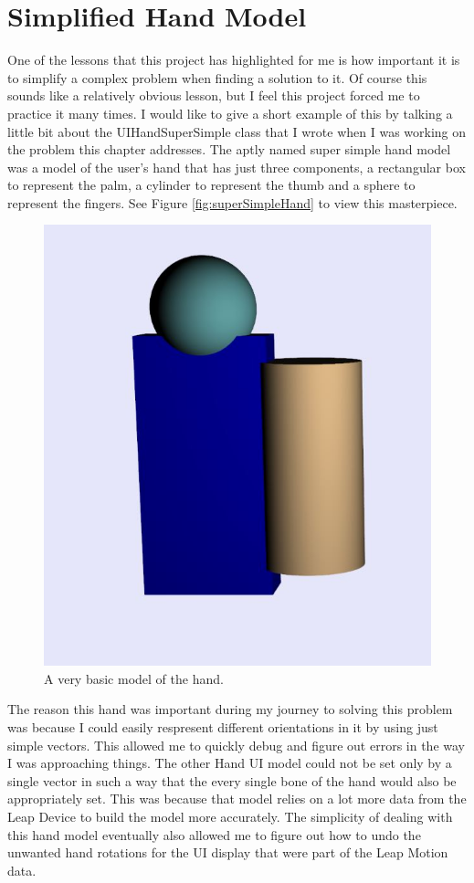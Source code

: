 \section{Simplified Hand Model}
One of the lessons that this project has highlighted for me is how important it is to simplify a complex problem when finding a solution to it. Of course this sounds like a relatively obvious lesson, but I feel this project forced me to practice it many times. I would like to give a short example of this by talking a little bit about the UIHandSuperSimple class that I wrote when I was working on the problem this chapter addresses. The aptly named super simple hand model was a model of the user's hand that has just three components, a rectangular box to represent the palm, a cylinder to represent the thumb and a sphere to represent the fingers. See Figure \ref{fig:superSimpleHand} to view this masterpiece. 
\begin{figure}[H]
\centering
\includegraphics[scale=0.35]{Figures/4_superSimpleHand.JPG}
\caption[UIHandSuperSimple Hand]{A very basic model of the hand.}
\label{fig:uncorrectedRoll}
\end{figure}
The reason this hand was important during my journey to solving this problem was because I could easily respresent different orientations in it by using just simple vectors. This allowed me to quickly debug and figure out errors in the way I was approaching things. The other Hand UI model could not be set only by a single vector in such a way that the every single bone of the hand would also be appropriately set. This was because that model relies on a lot more data from the Leap Device to build the model more accurately. The simplicity of dealing with this hand model eventually also allowed me to figure out how to undo the unwanted hand rotations for the UI display that were part of the Leap Motion data. 
	
